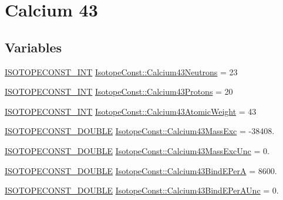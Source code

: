 \hypertarget{group___isotope_const-_calcium-_ca43}{}\section{Calcium 43}
\label{group___isotope_const-_calcium-_ca43}
\subsection*{Variables}
\begin{DoxyCompactItemize}
\item 
\mbox{\hyperlink{group___isotope_const-_macros_ga5f18360b3e99483a35c32d789e62621c}{I\+S\+O\+T\+O\+P\+E\+C\+O\+N\+S\+T\+\_\+\+I\+NT}} \mbox{\hyperlink{group___isotope_const-_calcium-_ca43_ga789094b6b3eccb7fbf7bb580540307a8}{Isotope\+Const\+::\+Calcium43\+Neutrons}} = 23
\item 
\mbox{\hyperlink{group___isotope_const-_macros_ga5f18360b3e99483a35c32d789e62621c}{I\+S\+O\+T\+O\+P\+E\+C\+O\+N\+S\+T\+\_\+\+I\+NT}} \mbox{\hyperlink{group___isotope_const-_calcium-_ca43_gaf726ade31f4fa1966ea47a25788a1bba}{Isotope\+Const\+::\+Calcium43\+Protons}} = 20
\item 
\mbox{\hyperlink{group___isotope_const-_macros_ga5f18360b3e99483a35c32d789e62621c}{I\+S\+O\+T\+O\+P\+E\+C\+O\+N\+S\+T\+\_\+\+I\+NT}} \mbox{\hyperlink{group___isotope_const-_calcium-_ca43_gac2ecb66956b66a0a262e9b52c2a46e37}{Isotope\+Const\+::\+Calcium43\+Atomic\+Weight}} = 43
\item 
\mbox{\hyperlink{group___isotope_const-_macros_ga8f45a7272ce02c0b4c65c44636ed719a}{I\+S\+O\+T\+O\+P\+E\+C\+O\+N\+S\+T\+\_\+\+D\+O\+U\+B\+LE}} \mbox{\hyperlink{group___isotope_const-_calcium-_ca43_gac2d71f4cf4c6132330ebd32a8cfb37dc}{Isotope\+Const\+::\+Calcium43\+Mass\+Exc}} = -\/38408.
\item 
\mbox{\hyperlink{group___isotope_const-_macros_ga8f45a7272ce02c0b4c65c44636ed719a}{I\+S\+O\+T\+O\+P\+E\+C\+O\+N\+S\+T\+\_\+\+D\+O\+U\+B\+LE}} \mbox{\hyperlink{group___isotope_const-_calcium-_ca43_ga51654308b55863209a86a75509d44b68}{Isotope\+Const\+::\+Calcium43\+Mass\+Exc\+Unc}} = 0.
\item 
\mbox{\hyperlink{group___isotope_const-_macros_ga8f45a7272ce02c0b4c65c44636ed719a}{I\+S\+O\+T\+O\+P\+E\+C\+O\+N\+S\+T\+\_\+\+D\+O\+U\+B\+LE}} \mbox{\hyperlink{group___isotope_const-_calcium-_ca43_ga73c97752f0f31568074b12481be8ffcb}{Isotope\+Const\+::\+Calcium43\+Bind\+E\+PerA}} = 8600.
\item 
\mbox{\hyperlink{group___isotope_const-_macros_ga8f45a7272ce02c0b4c65c44636ed719a}{I\+S\+O\+T\+O\+P\+E\+C\+O\+N\+S\+T\+\_\+\+D\+O\+U\+B\+LE}} \mbox{\hyperlink{group___isotope_const-_calcium-_ca43_ga89c4050857861f77be31a434563fe29d}{Isotope\+Const\+::\+Calcium43\+Bind\+E\+Per\+A\+Unc}} = 0.

\end{DoxyCompactItemize}
